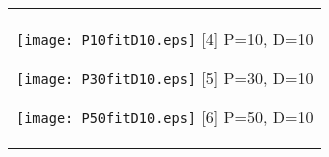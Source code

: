 \documentclass[a4paper,11pt,oneside,openany]{jsbook}
\begin{document}
\begin{figure}[htbp]
  \begin{center}
    \begin{tabular}{c}


      \begin{minipage}{0.33\hsize}
        \begin{center}
          \texttt{[image: P10fitD10.eps]}
          \hspace{1.2cm} [4] P=10, D=10
        \end{center}
      \end{minipage}

      \begin{minipage}{0.33\hsize}
        \begin{center}
          \texttt{[image: P30fitD10.eps]}
          \hspace{1.2cm} [5] P=30, D=10
        \end{center}
      \end{minipage}

      \begin{minipage}{0.33\hsize}
        \begin{center}
          \texttt{[image: P50fitD10.eps]}
          \hspace{1.2cm} [6] P=50, D=10
        \end{center}
      \end{minipage}
    \end{tabular}
  \end{center}
\end{figure}
\end{document}
